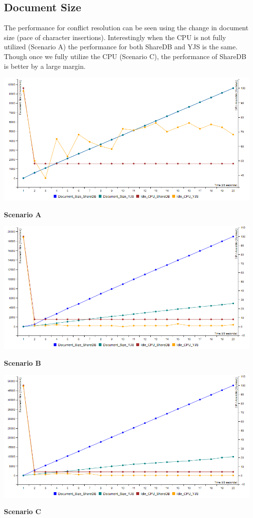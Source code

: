 \documentclass[12pt]{article}
\begin{document}
  \subsection{Document Size}
  The performance for conflict resolution can be seen using the change in document size (pace of character insertions).
  Interestingly when the CPU is not fully utilized (Scenario A) the performance for both ShareDB and YJS is the same.
  Though once we fully utilize the CPU (Scenario C), the performance of ShareDB is better by a large margin.
  \begin{center}
    \includegraphics[scale=0.48]{scenario_a/document.png}

    \textbf{Scenario A}
    
    \includegraphics[scale=0.48]{scenario_b/document.png}
    
    \textbf{Scenario B}
    
    \includegraphics[scale=0.48]{scenario_c/document.png}
    
    \textbf{Scenario C}
  \end{center}
\end{document}
